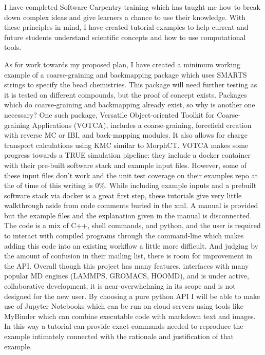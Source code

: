 I have completed Software Carpentry training which has taught me how to break down complex ideas and give learners a chance to use their knowledge.
With these principles in mind, I have created tutorial examples to help current and future students understand scientific concepts and how to use computational tools. %

As for work towards my proposed plan, I have created a minimum working example of a coarse-graining and backmapping package which uses SMARTS strings to specify the bead chemistries. %
This package will need further testing as it is tested on different compounds, but the proof of concept exists.
Packages which do coarse-graining and backmapping already exist, so why is another one necessary?
One such package, Versatile Object-oriented Toolkit for Coarse-graining Applications (VOTCA)\cite{Ruhle2011b}, includes a coarse-graining, forcefield creation with reverse MC or IBI, and back-mapping modules.
It also allows for charge transport calculations using KMC similar to MorphCT\cite{Lukyanov2010}.
VOTCA makes some progress towards a TRUE simulation pipeline: they include a docker container with their pre-built software stack and example input files.
However, some of these input files don't work and the unit test coverage on their examples repo at the of time of this writing is 0\%.
While including example inputs and a prebuilt software stack via docker is a great first step, these tutorials give very little walkthrough aside from code comments buried in the xml\cite{votca-github}.
A manual is provided but the example files and the explanation given in the manual is disconnected. %
The code is a mix of C++, shell commands, and python, and the user is required to interact with compiled programs through the command-line which makes adding this code into an existing workflow a little more difficult.
And judging by the amount of confusion in their mailing list, there is room for improvement in the API.%
Overall though this project has many features, interfaces with many popular MD engines (LAMMPS, GROMACS, HOOMD), and is under active, collaborative development, it is near-overwhelming in its scope and is not designed for the new user.
By choosing a pure python API I will be able to make use of Jupyter Notebooks which can be run on cloud servers using tools like MyBinder which can combine executable code with markdown text and images.%
In this way a tutorial can provide exact commands needed to reproduce the example intimately connected with the rationale and justification of that example.

